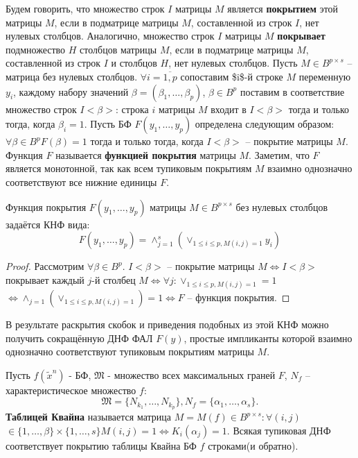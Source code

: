 \documentclass[11pt]{article}
\newcounter{th}\setcounter{th}{0}
\newcounter{cnsqnc}\setcounter{cnsqnc}{0}
\def\cnsqnc{\par\smallskip\refstepcounter{cnsqnc}\textbf{\arabic{cnsqnc}}}
\newtheorem*{Consequence}{Следствие \cnsqnc}
\newcounter{stnmt}\setcounter{stnmt}{0}
\def\st{\par\smallskip\refstepcounter{stnmt}\textbf{\arabic{stnmt}}}
\newtheorem*{Statement}{Утверждение \st}
\begin{document}
Будем говорить, что множество строк \(I\) матрицы \(M\) является \textbf{покрытием} этой матрицы \(M\),
если в подматрице матрицы \(M\), составленной из строк \(I\), нет нулевых столбцов. Аналогично,
множество строк \(I\) матрицы \(M\) \textbf{покрывает} подмножество \(H\) столбцов матрицы \(M\), если в
подматрице матрицы \(M\), составленной из строк \(I\) и столбцов \(H\), нет нулевых столбцов.
Пусть \(M \in B^{p\times s}\) -- матрица без нулевых столбцов. \(\forall i = \overline{1, p}\)
сопоставим \$i\$-й строке \(M\) переменную \(y_i\), каждому набору значений \(\beta = (\beta_1, \ldots, \beta_p)\),
\(\beta \in B^p\) поставим в соответствие множество строк \(I<\beta>\): строка \(i\) матрицы \(M\)
входит в \(I<\beta>\) тогда и только тогда, когда \(\beta_i = 1\).
Пусть БФ \(F(y_1, \ldots, y_p)\) определена следующим образом: \(\forall \beta \in B^p F(\beta) = 1\)
тогда и только тогда, когда \(I<\beta>\) -- покрытие матрицы \(M\). Функция \(F\) называется
\textbf{функцией покрытия} матрицы \(M\). Заметим, что \(F\) является монотонной, так как всем тупиковым
покрытиям \(M\) взаимно однозначно соответствуют все нижние единицы \(F\).
\begin{Statement}
Функция покрытия $F(y_1, \ldots, y_p)$ матрицы $M \in B^{p\times s}$ без нулевых столбцов задаётся
КНФ вида:
\begin{equation*}
F(y_1, \ldots, y_p) = \wedge_{j = 1}^s\left(\vee_{1 \leq i \leq p, M(i, j) = 1}y_i\right)
\end{equation*}
\end{Statement}
\begin{proof}
Рассмотрим $\forall \beta \in B^p$. $I<\beta>$ -- покрытие матрицы $M \Leftrightarrow I<\beta>$
покрывает каждый $j$-й столбец $M \Leftrightarrow \forall j: \vee_{1 \leq i \leq p, M(i, j) = 1} = 1$
$\Leftrightarrow \wedge_{j = 1}\left(\vee_{1 \leq i \leq p, M(i, j) = 1}\right) = 1 \Leftrightarrow F$
-- функция покрытия.
\end{proof}
\begin{Consequence}
В результате раскрытия скобок и приведения подобных из этой КНФ можно получить сокращённую ДНФ
ФАЛ $F(y)$, простые импликанты которой взаимно однозначно соответствуют тупиковым покрытиям
матрицы $M$.
\end{Consequence}
Пусть \(f(\tilde{x}^n)\) - БФ, \(\mathfrak{M}\) - множество всех максимальных граней \(F\), \(N_f\) --
характеристическое множество \(f\):
\begin{equation*}
\mathfrak{M} = \{N_{k_1}, \ldots, N_{k_p}\}, N_f = \{\alpha_1, \ldots, \alpha_s\}.
\end{equation*}
\textbf{Таблицей Квайна} называется матрица \(M = M(f) \in B^{p \times s}: \forall(i, j)\)
\(\in \{1, \ldots, \beta\}\times\{1, \ldots, s\} M(i, j) = 1 \Leftrightarrow K_i(\alpha_j) = 1\).
Всякая тупиковая ДНФ соответствует покрытию таблицы Квайна БФ \(f\) строками(и обратно).
\end{document}
